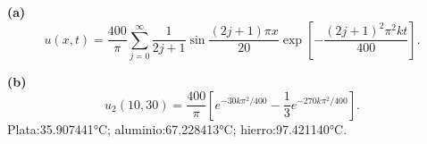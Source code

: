 \noindent\textbf{(a)} \[u(x,t)=\frac{400}\pi\sum_{j=0}^{\infty}\frac{1}{2j+1}
\sin\frac{(2j+1)\pi x}{20}\exp\left[-\frac{(2j+1)^2\pi^2kt}{400}\right].\]

\noindent\textbf{(b)} \[u_2(10,30)=\frac{400}\pi\left[e^{-30k\pi^2/400}-\frac13e^{-270k\pi^2/400}\right].\]
Plata:35.907441°C; aluminio:67.228413°C; hierro:97.421140°C.
